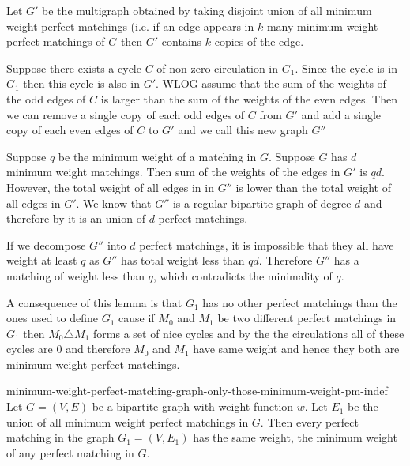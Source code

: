 \begin{alternate-proof}
		Let $G'$ be the multigraph obtained by taking disjoint union of all minimum weight perfect matchings (i.e. if an edge appears in $k$ many minimum weight perfect matchings of $G$ then $G'$ contains  $k$ copies of the edge.
		
		
		Suppose there exists a cycle $C$ of non zero circulation in $G_1$. Since the cycle is in $G_1$ then this cycle is also in $G'$. WLOG  assume that the sum of the weights of the odd edges of $C$ is larger than the sum of the weights of the even edges. Then we can remove a single copy of each odd edges of $C$ from $G'$ and add a single copy of each even edges of $C$ to $G'$ and we call this new graph $G''$
		
		Suppose $q$ be the minimum weight of a matching in $G$. Suppose $G$ has $d$ minimum weight matchings. Then sum of the weights of the edges in $G'$ is $qd$.	However, the total weight of all edges in in $G''$ is lower than the total weight of all edges in $G'$. We know  that $G''$ is a regular bipartite graph of degree $d$ and therefore by  it is an union of $d$ perfect matchings.
		
		If we decompose $G''$ into $d$ perfect matchings, it is impossible that they all have weight at least $q$ as $G''$ has total weight less than $qd$. Therefore $G''$ has a matching of weight less than $q$, which contradicts the minimality of $q$. 
\end{alternate-proof}
A consequence of this lemma is that $G_1$ has no other perfect matchings than the ones used to define $G_1$ cause if $M_0$ and $M_1$ be two different perfect matchings in $G_1$ then $M_0\triangle M_1$ forms a set of nice cycles and by the  the circulations all of these cycles are 0 and therefore $M_0$ and $M_1$ have same weight and hence they both are minimum weight perfect matchings.
\begin{corolary}{}{minimum-weight-perfect-matching-graph-only-those-minimum-weight-pm-indef}
	Let $G=(V,E)$ be a bipartite graph with weight function $w$. Let $E_1$ be the union of all minimum weight perfect matchings in $G$. Then every perfect matching in the graph $G_1=(V,E_1)$ has the same weight, the minimum weight of any perfect matching in $G$.
\end{corolary}
